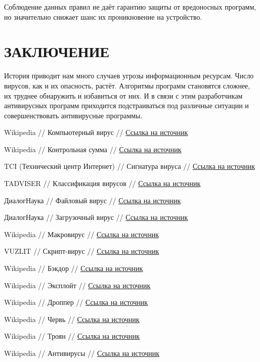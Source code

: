 \documentclass[12pt]{article}
\begin{document}
Соблюдение данных правил не даёт гарантию защиты от вредоносных программ, но значительно снижает шанс их проникновение на устройство.

\newpage
\section*{ЗАКЛЮЧЕНИЕ}

История приводит нам много случаев угрозы информационным ресурсам. Число вирусов, как и их опасность, растёт. Алгоритмы программ становятся сложнее, их труднее обнаружить и избавиться от них. И в связи с этим разработчикам антивирусных программ приходится подстраиваться под различные ситуации и совершенствовать антивирусные программы.

\begin{thebibliography}{11}

Wikipedia // Компьютерный вирус // \href{https://en.wikipedia.org/wiki/Computer_virus}{\underline{Ссылка на источник}}

Wikipedia // Контрольная сумма // \href{https://en.wikipedia.org/wiki/Checksum}{\underline{Ссылка на источник}}

TCI (Технический центр Интернет) // Сигнатура вируса // \href{https://www.tcinet.ru/press-centre/glossary/article.php?ELEMENT_ID=5129}{\underline{Ссылка на источник}}

TADVISER // Классификация вирусов // \href{https://goo-gl.ru/SMmIV}{\underline{Ссылка на источник}}

ДиалогНаука // Файловый вирус // \href{https://www.dialognauka.ru/support/golossary/4572/}{\underline{Ссылка на источник}}

ДиалогНаука // Загрузочный вирус // \href{https://www.dialognauka.ru/support/golossary/4574/?sphrase_id=61810}{\underline{Ссылка на источник}}

Wikipedia // Макровирус // \href{https://goo-gl.ru/bncO9}{\underline{Ссылка на источник}}

VUZLIT // Скрипт-вирус // \href{https://vuzlit.ru/1022038/skript_virusy}{\underline{Ссылка на источник}}

Wikipedia // Бэкдор // \href{https://goo-gl.ru/FAcyf}{\underline{Ссылка на источник}}

Wikipedia // Эксплойт // \href{https://goo-gl.ru/f9X1d}{\underline{Ссылка на источник}}

Wikipedia // Дроппер // \href{https://goo-gl.ru/NCbCc}{\underline{Ссылка на источник}}

Wikipedia // Червь // \href{https://goo-gl.ru/6PGEf}{\underline{Ссылка на источник}}

Wikipedia // Троян // \href{https://goo-gl.ru/dPriv}{\underline{Ссылка на источник}}

Wikipedia // Антивирусы // \href{https://goo-gl.ru/5XWi}{\underline{Ссылка на источник}}
\end{thebibliography}
\end{document}
